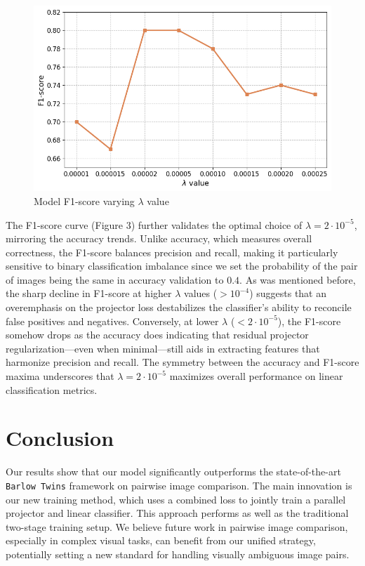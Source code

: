 \documentclass{article}
\begin{document}
\begin{figure}
    \centering
    \includegraphics[width=1\linewidth]{fig/BTA-combined_lambdas-f1-score.png}
    \caption{Model F1-score varying $\lambda$ value}
\end{figure}
The F1-score curve (Figure 3) further validates the optimal choice of $\lambda = 2 \cdot 10^{-5}$, mirroring the accuracy trends. Unlike accuracy, which measures overall correctness, the F1-score balances precision and recall, making it particularly sensitive to binary classification imbalance since we set the probability of the pair of images being the same in accuracy validation to $0.4$. As was mentioned before, the sharp decline in F1-score at higher $\lambda$ values ($>10^{-4}$) suggests that an overemphasis on the projector loss destabilizes the classifier’s ability to reconcile false positives and negatives. Conversely, at lower $\lambda$ ($<2 \cdot 10^{-5}$), the F1-score somehow drops as the accuracy does indicating that residual projector regularization—even when minimal—still aids in extracting features that harmonize precision and recall. The symmetry between the accuracy and F1-score maxima underscores that $\lambda = 2 \cdot 10^{-5}$ maximizes overall performance on linear classification metrics.

\section{Conclusion}\label{sec:concl}

Our results show that our model significantly outperforms the state-of-the-art \texttt{Barlow Twins} framework \cite{zbontar2021barlow} on pairwise image comparison. The main innovation is our new training method, which uses a combined loss to jointly train a parallel projector and linear classifier. This approach performs as well as the traditional two-stage training setup. We believe future work in pairwise image comparison, especially in complex visual tasks, can benefit from our unified strategy, potentially setting a new standard for handling visually ambiguous image pairs.
\end{document}
